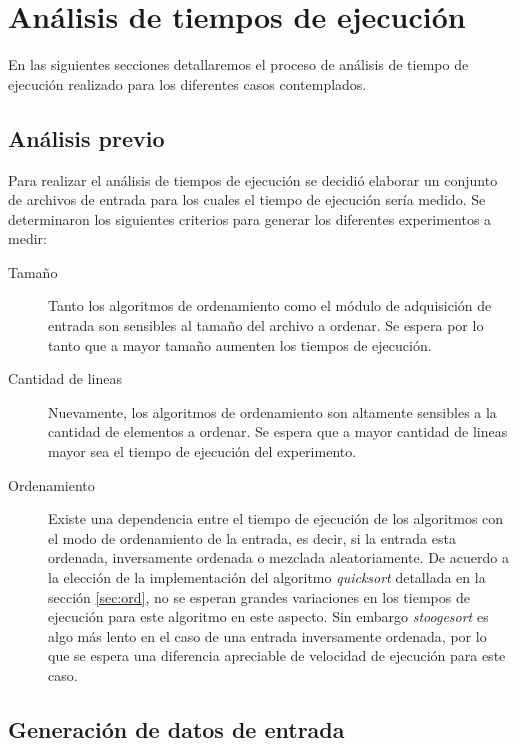 \documentclass[a4paper,11pt]{article}
\begin{document}
\section{Análisis de tiempos de ejecución}

En las siguientes secciones detallaremos el proceso de análisis de tiempo de
ejecución realizado para los diferentes casos contemplados.

\subsection{Análisis previo}\label{sec:tiempos}

Para realizar el análisis de tiempos de ejecución se decidió elaborar un
conjunto de archivos de entrada para los cuales el tiempo de ejecución sería
medido. Se determinaron los siguientes criterios para generar los diferentes
experimentos a medir:

\begin{description}

  \item[Tamaño] Tanto los algoritmos de ordenamiento como el módulo
    de adquisición de entrada son sensibles al tamaño del archivo a ordenar. Se
    espera por lo tanto que a mayor tamaño aumenten los tiempos de ejecución.

  \item[Cantidad de lineas] Nuevamente, los algoritmos de ordenamiento son
    altamente sensibles a la cantidad de elementos a ordenar. Se espera que a
    mayor cantidad de lineas mayor sea el tiempo de ejecución del experimento.

  \item[Ordenamiento] Existe una dependencia entre el tiempo de ejecución de
    los algoritmos con el modo de ordenamiento de la entrada, es decir, si la
    entrada esta ordenada, inversamente ordenada o mezclada aleatoriamente. De
    acuerdo a la elección de la implementación del algoritmo \textit{quicksort}
    detallada en la sección \ref{sec:ord}, no se esperan grandes variaciones en
    los tiempos de ejecución para este algoritmo en este aspecto. Sin embargo
    \textit{stoogesort} es algo más lento en el caso de una entrada
    inversamente ordenada, por lo que se espera una diferencia apreciable de
    velocidad de ejecución para este caso.

\end{description}

\subsection{Generación de datos de entrada}
\end{document}
